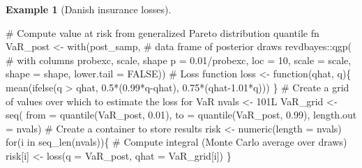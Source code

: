 \documentclass[
  11pt,
  letterpaper,
]{scrbook}
\newenvironment{Shaded}{\begin{snugshade}}{\end{snugshade}}
\newcommand{\AttributeTok}[1]{\textcolor[rgb]{0.40,0.45,0.13}{#1}}
\newcommand{\CommentTok}[1]{\textcolor[rgb]{0.37,0.37,0.37}{#1}}
\newcommand{\ConstantTok}[1]{\textcolor[rgb]{0.56,0.35,0.01}{#1}}
\newcommand{\ControlFlowTok}[1]{\textcolor[rgb]{0.00,0.23,0.31}{#1}}
\newcommand{\DecValTok}[1]{\textcolor[rgb]{0.68,0.00,0.00}{#1}}
\newcommand{\FloatTok}[1]{\textcolor[rgb]{0.68,0.00,0.00}{#1}}
\newcommand{\FunctionTok}[1]{\textcolor[rgb]{0.28,0.35,0.67}{#1}}
\newcommand{\NormalTok}[1]{\textcolor[rgb]{0.00,0.23,0.31}{#1}}
\newcommand{\OtherTok}[1]{\textcolor[rgb]{0.00,0.23,0.31}{#1}}
\newcommand{\SpecialCharTok}[1]{\textcolor[rgb]{0.37,0.37,0.37}{#1}}
\theoremstyle{definition}
\newtheorem{example}{Example}[chapter]
\theoremstyle{definition}
\theoremstyle{definition}
\theoremstyle{plain}
\theoremstyle{remark}
\begin{document}
\begin{example}[Danish insurance
losses]
\begin{Shaded}
\begin{Highlighting}[]
\CommentTok{\# Compute value at risk from generalized Pareto distribution quantile fn}
\NormalTok{VaR\_post }\OtherTok{\textless{}{-}} \FunctionTok{with}\NormalTok{(post\_samp,   }\CommentTok{\# data frame of posterior draws}
\NormalTok{            revdbayes}\SpecialCharTok{::}\FunctionTok{qgp}\NormalTok{(   }\CommentTok{\# with columns \textquotesingle{}probexc\textquotesingle{}, \textquotesingle{}scale\textquotesingle{}, \textquotesingle{}shape\textquotesingle{}}
  \AttributeTok{p =} \FloatTok{0.01}\SpecialCharTok{/}\NormalTok{probexc, }
  \AttributeTok{loc =} \DecValTok{10}\NormalTok{, }
  \AttributeTok{scale =}\NormalTok{ scale, }
  \AttributeTok{shape =}\NormalTok{ shape, }
  \AttributeTok{lower.tail =} \ConstantTok{FALSE}\NormalTok{))}
\CommentTok{\# Loss function}
\NormalTok{loss }\OtherTok{\textless{}{-}} \ControlFlowTok{function}\NormalTok{(qhat, q)\{}
    \FunctionTok{mean}\NormalTok{(}\FunctionTok{ifelse}\NormalTok{(q }\SpecialCharTok{\textgreater{}}\NormalTok{ qhat,}
           \FloatTok{0.5}\SpecialCharTok{*}\NormalTok{(}\FloatTok{0.99}\SpecialCharTok{*}\NormalTok{q}\SpecialCharTok{{-}}\NormalTok{qhat),}
           \FloatTok{0.75}\SpecialCharTok{*}\NormalTok{(qhat}\FloatTok{{-}1.01}\SpecialCharTok{*}\NormalTok{q)))}
\NormalTok{\}}
\CommentTok{\# Create a grid of values over which to estimate the loss for VaR}
\NormalTok{nvals }\OtherTok{\textless{}{-}}\NormalTok{ 101L}
\NormalTok{VaR\_grid }\OtherTok{\textless{}{-}} \FunctionTok{seq}\NormalTok{(}
  \AttributeTok{from =} \FunctionTok{quantile}\NormalTok{(VaR\_post, }\FloatTok{0.01}\NormalTok{),}
  \AttributeTok{to =} \FunctionTok{quantile}\NormalTok{(VaR\_post, }\FloatTok{0.99}\NormalTok{), }
  \AttributeTok{length.out =}\NormalTok{ nvals)}
\CommentTok{\# Create a container to store results}
\NormalTok{risk }\OtherTok{\textless{}{-}} \FunctionTok{numeric}\NormalTok{(}\AttributeTok{length =}\NormalTok{ nvals)}
\ControlFlowTok{for}\NormalTok{(i }\ControlFlowTok{in} \FunctionTok{seq\_len}\NormalTok{(nvals))\{}
  \CommentTok{\# Compute integral (Monte Carlo average over draws)}
\NormalTok{ risk[i] }\OtherTok{\textless{}{-}} \FunctionTok{loss}\NormalTok{(}\AttributeTok{q =}\NormalTok{ VaR\_post, }\AttributeTok{qhat =}\NormalTok{ VaR\_grid[i])}
\NormalTok{\}}
\end{Highlighting}
\end{Shaded}

\begin{figure}[ht!]


\end{figure}
\end{example}
\end{document}
